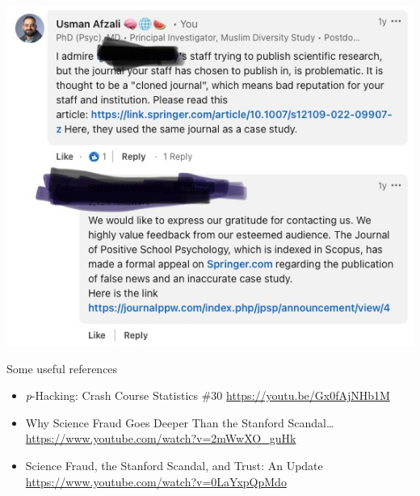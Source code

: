 \documentclass[
  ignorenonframetext,
  aspectratio=169,
]{beamer}
\providecommand{\tightlist}{%
  \setlength{\itemsep}{0pt}\setlength{\parskip}{0pt}}\usepackage{longtable,booktabs,array}
\begin{document}
\begin{frame}{}
\label{section-4}
\begin{center}
\includegraphics{figs/su.jpg}
\end{center}
\end{frame}

\begin{frame}{Some useful references}
\label{some-useful-references}
\begin{itemize}
\tightlist
\item
  \emph{p}-Hacking: Crash Course Statistics \#30
  \url{https://youtu.be/Gx0fAjNHb1M}
\item
  Why Science Fraud Goes Deeper Than the Stanford Scandal\ldots{}
  \url{https://www.youtube.com/watch?v=2mWwXO_guHk}\\
\item
  Science Fraud, the Stanford Scandal, and Trust: An Update
  \url{https://www.youtube.com/watch?v=0LaYxpQpMdo}
\end{itemize}
\end{frame}
\end{document}

